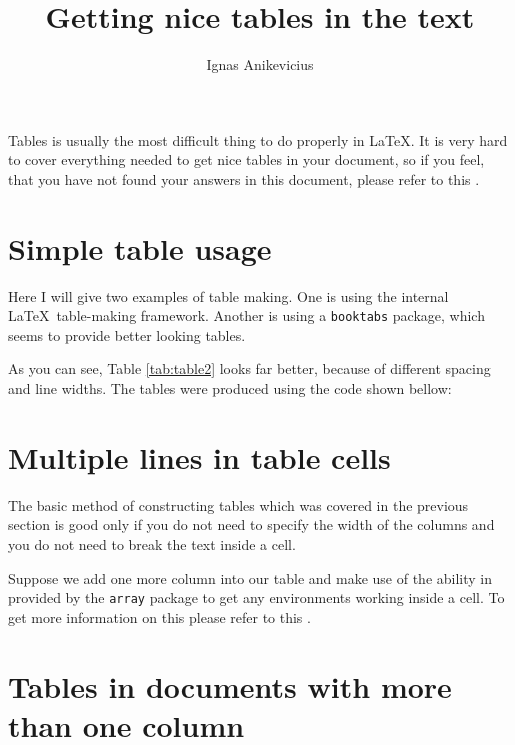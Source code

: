 \documentclass[
    draft
]{scrartcl}
\title{Getting nice tables in the text}
\author{Ignas Anikevicius}
\begin{document}
\maketitle

Tables is usually the most difficult thing to do properly in \LaTeX . It is very
hard to cover everything needed to get nice tables in your document, so if you
feel, that you have not found your answers in this document, please refer to
this 
.

\tableofcontents

\section{Simple table usage}

Here I will give two examples of table making. One is using the internal \LaTeX\
table-making framework. Another is using a \verb|booktabs| package, which seems
to provide better looking tables.




As you can see, Table \ref{tab:table2} looks far better, because of different
spacing and line widths. The tables were produced using the code shown bellow:



\section{Multiple lines in table cells}

The basic method of constructing tables which was covered in the previous
section is good only if you do not need to specify the width of the columns and
you do not need to break the text inside a cell.

Suppose we add one more column into our table and make use of the ability in
provided by the \verb|array| package to get any environments working inside a
cell. To get more information on this please refer to this 
.




\section{Tables in documents with more than one column}
\end{document}

